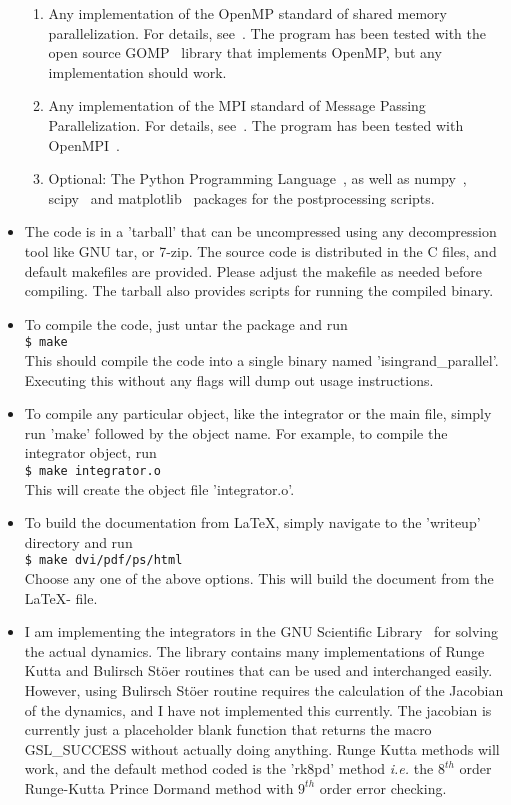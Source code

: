 \documentclass[a4paper,10pt]{article}
\newcommand{\shellcmd}[1]{\\\indent\indent\texttt{\footnotesize\$ #1}\\}
\begin{document}
\begin{itemize}
\begin{enumerate}
  \item
  Any implementation of the OpenMP standard of shared memory parallelization. For details, see~\cite{openmp}. The program has been tested with the open source GOMP~\cite{gomp} library that implements OpenMP, but any implementation should work.
  \item
  Any implementation of the MPI standard of Message Passing Parallelization. For details, see~\cite{mpi}. The program has been tested with OpenMPI~\cite{openmpi}.
\item
 Optional: The Python Programming Language~\cite{python}, as well as numpy~\cite{numpy}, scipy~\cite{scipy} and matplotlib~\cite{matplotlib} packages for the postprocessing scripts.
 \end{enumerate}
 \item
 The code is in a 'tarball' that can be uncompressed using any decompression tool like GNU tar, or 7-zip. The source code is distributed in the C files, and default makefiles are provided. Please adjust the makefile as needed before compiling. The tarball also provides scripts for running the compiled binary.
 \item
 To compile the code, just untar the package and run  
 \shellcmd{make}
 This should compile the code into a single binary named 'isingrand\_parallel'. Executing this without any flags will dump out usage instructions.  
 \item
 To compile any particular object, like the integrator or the main file, simply run 'make' followed by the object name. For example, to compile the integrator object, run
 \shellcmd{make integrator.o}
 This will create the object file 'integrator.o'.
 \item
 To build the documentation from \LaTeX , simply navigate to the 'writeup' directory and run
 \shellcmd{make dvi/pdf/ps/html}
 Choose any one of the above options. This will build the document from the \LaTeX - file.
 \item
  I am implementing the integrators in the GNU Scientific Library~\cite{galassi:gsl} for solving the actual dynamics. The library contains many implementations of Runge Kutta and Bulirsch St\"oer routines that can be used and interchanged easily. However, using Bulirsch St\"oer routine requires the calculation of the Jacobian of the dynamics, and I have not implemented this currently. The jacobian is currently just a placeholder blank function that returns the macro GSL\_SUCCESS without actually doing anything. Runge Kutta methods will work, and the default method coded is the 'rk8pd' method \textit{i.e.} the $8^{th}$ order Runge-Kutta Prince Dormand method with $9^{th}$ order error checking.

\end{itemize}
\end{document}
